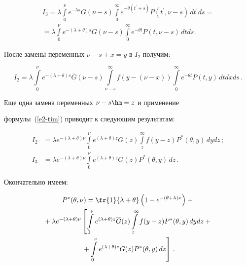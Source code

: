     

    \begin{multline*}

    I_3=\lambda \int\limits_0^\nu e^{-\lambda s} G(\nu-s) \int\limits_0^\infty e^{-

\theta(t^\prime+s)} P(t^\prime, \nu-s)\,dt^\prime ds={}\\

    {}=\lambda \int\limits_0^\nu e^{-(\lambda+\theta)s} G(\nu-s) 

\int\limits_0^\infty e^{-\theta t}P(t,\nu-s)\,dt ds\,.

    \end{multline*}

    После замены переменных $\nu-s+x=y$ в $I_2$ получим:

    $$

    I_2=\lambda \int\limits_0^\nu e^{-(\lambda+\theta)s} \overline{G} (\nu-s) 

\int\limits_{\nu-s}^\infty f(y-(\nu-x))\int\limits_0^\infty e^{-\theta t} P(t,y)\,dt dx ds\,.

    $$

    

    Еще одна замена переменных $\nu-s\hm=z$ и применение 

формулы~(\ref{e2-tim}) приводит к следующим результатам:



\noindent

    \begin{align*}

    I_2 &= \lambda e^{-(\lambda+\theta)\nu} \int\limits_0^\nu e^{(\lambda +\theta) 

z} \overline{G}(z) \int\limits_z^\infty f(y-z) P^*(\theta,y)\,dy dz\,;\\

    I_3 &= \lambda e^{-(\lambda+\theta)\nu} \int\limits_0^\nu e^{(\lambda 

+\theta)z} G(z) P^*(\theta,y)\,dz\,.

    \end{align*}

    

     

    Окончательно имеем:

    \begin{multline}

    P^*(\theta,\nu) =\fr{1}{\lambda+\theta} \left( 1-e^{-

(\theta+\lambda)\nu}\right)+{}\\

    {}+\lambda e^{-(\lambda+\theta)\nu}\left[ \int\limits_0^\nu e^{(\lambda 

+\theta)z} \overline{G}(z) \int\limits_z^\infty f(y-z) P^*(\theta, y)\,dy dz +{}\right.\\ 

\left.{}+\int\limits_0^\nu e^{(\lambda+\theta)z} G(z) P^* (\theta, y)\,dz\right]\,.

    \label{e4-tim}

    \end{multline}

